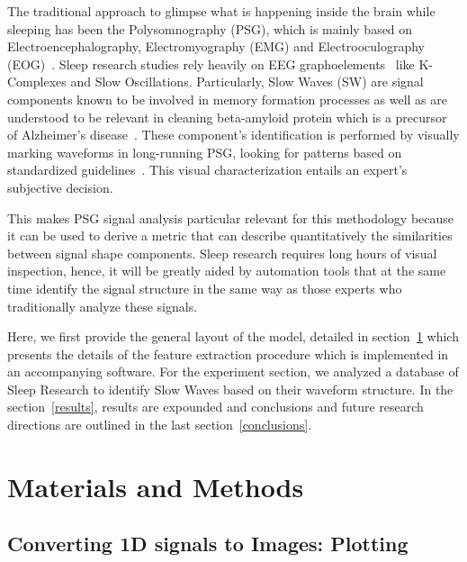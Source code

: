 \documentclass[review]{elsarticle}
\begin{document}
    The traditional approach to glimpse what is happening inside the brain while sleeping has been the Polysomnography (PSG), which is mainly based on Electroencephalography, Electromyography (EMG) and Electrooculography (EOG)~\cite{Yan2019}.  Sleep research studies rely heavily on EEG graphoelements~\cite{Boostani2017} like K-Complexes and Slow Oscillations.  Particularly, Slow Waves (SW) are signal components known to be involved in memory formation processes as well as are understood to be relevant in cleaning beta-amyloid protein which is a precursor of Alzheimer's disease~\cite{Ngo2020}.  These component's identification is performed by visually marking waveforms in long-running PSG, looking for patterns based on standardized guidelines~\cite{Rodenbeck2006,RK,AASM}.   This visual characterization entails an expert's subjective decision.
   

This makes PSG signal analysis particular relevant for this methodology because it can be used to derive a metric that can describe quantitatively the similarities between signal shape components.  Sleep research requires long hours of visual inspection, hence, it will be greatly aided by automation tools that at the same time identify the signal structure in the same way as those experts who traditionally analyze these signals.


Here, we first provide the general layout of the model, detailed in section~\ref{materials} which presents the details of the feature extraction procedure which is implemented in an accompanying software.  For the experiment section, we analyzed a database of Sleep Research to identify Slow Waves based on their waveform structure.  In the section~\ref{results}, results are expounded and conclusions and future research directions are outlined in the last section~\ref{conclusions}.


\section{Materials and Methods}
\label{materials}
\subsection{Converting 1D signals to Images: Plotting}
\end{document}
